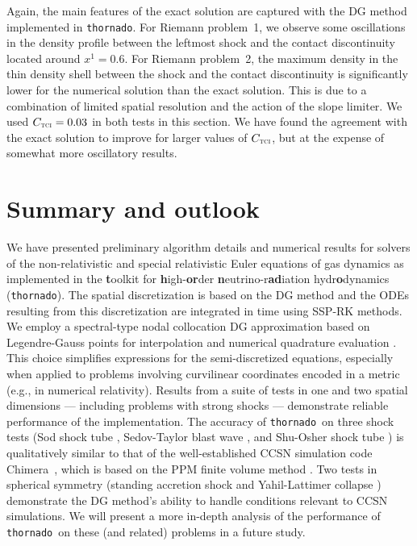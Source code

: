 \documentclass[letterpaper]{jpconf}
\newcommand{\TCI}{\textnormal{\tiny\textsc{TCI}}}
\newcommand{\thornado}{\texttt{thornado}}
\newcommand{\chimera}{{\sc Chimera}}
\begin{document}
Again, the main features of the exact solution are captured with the DG method implemented in \thornado.  
For Riemann problem~1, we observe some oscillations in the density profile between the leftmost shock and the contact discontinuity located around $x^{1}=0.6$.  
For Riemann problem~2, the maximum density in the thin density shell between the shock and the contact discontinuity is significantly lower for the numerical solution than the exact solution.  
This is due to a combination of limited spatial resolution and the action of the slope limiter.  
We used $C_{\TCI}=0.03$ in both tests in this section.  
We have found the agreement with the exact solution to improve for larger values of $C_{\TCI}$, but at the expense of somewhat more oscillatory results.  

\section{Summary and outlook}

We have presented preliminary algorithm details and numerical results for solvers of the non-relativistic and special relativistic Euler equations of gas dynamics as implemented in the {\bf t}oolkit for {\bf h}igh-{\bf or}der {\bf n}eutrino-r{\bf ad}iation hydr{\bf o}dynamics (\thornado).  
The spatial discretization is based on the DG method and the ODEs resulting from this discretization are integrated in time using SSP-RK methods.  
We employ a spectral-type nodal collocation DG approximation based on Legendre-Gauss points for interpolation and numerical quadrature evaluation \cite{bassi_etal_2013}.  
This choice simplifies expressions for the semi-discretized equations, especially when applied to problems involving curvilinear coordinates encoded in a metric (e.g., in numerical relativity).  
Results from a suite of tests in one and two spatial dimensions --- including problems with strong shocks --- demonstrate reliable performance of the implementation.  
The accuracy of \thornado\ on three shock tests (Sod shock tube \cite{sod_1978}, Sedov-Taylor blast wave \cite{sedov_1959}, and Shu-Osher shock tube \cite{shuOsher_1989}) is qualitatively similar to that of the well-established CCSN simulation code \chimera\ \cite{bruenn_etal_2018}, which is based on the PPM finite volume method \cite{colellaWoodward_1984}.  
Two tests in spherical symmetry (standing accretion shock \cite{blondin_etal_2003} and Yahil-Lattimer collapse \cite{yahilLattimer_1982,yahil_1983}) demonstrate the DG method's ability to handle conditions relevant to CCSN simulations.  
We will present a more in-depth analysis of the performance of \thornado\ on these (and related) problems in a future study.  
\end{document}
